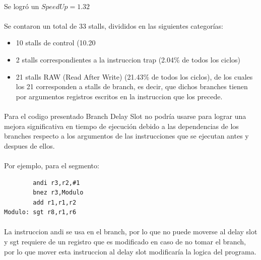 \documentclass[a4paper,11pt]{article}
\begin{document}
\begin{enumerate}
\paragraph{}
Se logr\'o un $SpeedUp = 1.32$

\paragraph{} 
Se contaron un total de 33 stalls, divididos en las siguientes categorías:

\begin{itemize}
\item 10 stalls de control (10.20%
\item 2  stalls correspondientes a la instruccion trap (2.04\% de todos los ciclos)
\item 21 stalls RAW (Read After Write) (21.43\% de todos los ciclos), de los cuales los 21 corresponden a stalls de branch, es decir, que dichos branches tienen por argumentos registros escritos en la instruccion que los precede.
\end{itemize}

\paragraph{} 
Para el codigo presentado Branch Delay Slot no podría usarse para lograr una mejora significativa en tiempo de ejecuci\'on debido a las dependencias de los branches respecto a los argumentos de las instrucciones que se ejecutan antes y despues de ellos.

\paragraph{} 
Por ejemplo, para el segmento:

\begin{center}
\begin{verbatim}
		andi r3,r2,#1 
		bnez r3,Modulo 
		add r1,r1,r2 
Modulo:	sgt r8,r1,r6
\end{verbatim}
\end{center}

\paragraph{} 
La instruccion andi se usa en el branch, por lo que no puede moverse al delay slot y sgt requiere de un registro que es modificado en caso de no tomar el branch, por lo que mover esta instruccion al delay slot modificaría la logica del programa.



\end{enumerate}
\end{document}
